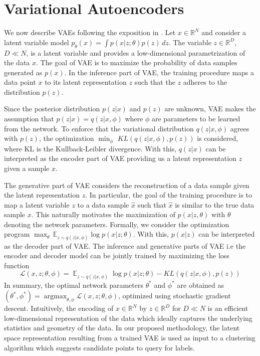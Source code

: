 \documentclass{article}
\DeclareMathOperator*{\argmax}{argmax} %
\def\R{\mathbb{R}}
\def\R{{\mathbb R}}
\def\E{{\mathbb E}}
\begin{document}

\section{Variational Autoencoders }

We now describe VAEs following the exposition in \cite{yang2018geodesic}. Let $x \in \R^N $ and consider a latent variable model $p_{\theta}(x) = \int p(x|z;\theta)p(z)\,dz$. The variable $z\in \R^{D}$, $D\ll N$, is a latent variable and provides a low-dimensional parametrization of the data $x$. The goal of VAE is to maximize the probability of  data samples generated as $p(x)$. In the inference part of VAE, the training procedure maps a data point $x$  to its latent representation $z$ such that the $z$ adheres to the distribution $p(z)$. 

Since the posterior distribution $p(z|x)$ and $p(z)$ are unknown, VAE makes the assumption that $p(z|x) = q(z|x,\phi)$ where $\phi$ are parameters to be learned from the network. To enforce that the variational distribution $q(z|x,\phi)$ agrees with $p(z)$, the optimization $\min_{\phi}\,\, KL(q(z|x,\phi),p(z))$ is considered, where KL is the Kullback-Leibler divergence.  With this, $q(z|x)$ can be interpreted as the encoder part of VAE providing us a latent representation $z$ given a sample $x$. 

The generative part of VAE considers the reconstruction of a data sample given the latent representation $z$. In particular, the goal of the training procedure is to map a latent variable $z$ to a data sample $\hat{x}$ such that $\hat{x}$ is similar to the true data sample $x$. This naturally motivates the maximization of $p(x|z,\theta)$ with $\theta$ denoting the network parameters. Formally, we consider the optimization program $\max_{\theta}\, \E_{z \sim q(z|x,\phi)} \log p(x|z;\theta)$.  With this, $p(x|z)$ can be interpreted as the decoder part of VAE. The inference and generative parts of VAE i.e the encoder and decoder model can be jointly trained by maximizing the loss function $$\mathcal{L}(x,z;\theta,\phi)
=  \displaystyle\mathop{\E}_{z\sim q(z|x,\phi)} \log p(x|z;\theta)- KL(q(z|x,\phi),p(z))$$ In summary, the optimal network parameters $\theta^{*}$ and $\phi^{*}$ are obtained as $(\theta^{*},\phi^{*})=\argmax_{\theta,\phi} \mathcal{L}(x,z;\theta,\phi)$, optimized using stochastic gradient descent.  Intuitively, the encoding of $x\in\mathbb{R}^{N}$ by $z\in\mathbb{R}^{D}$ for $D\ll N$ is an efficient low-dimensional representation of the data which ideally captures the underlying statistics and geometry of the data.  In our proposed methodology, the latent space representation resulting from a trained VAE is used as input to a clustering algorithm which suggests candidate points to query for labels.
\end{document}
